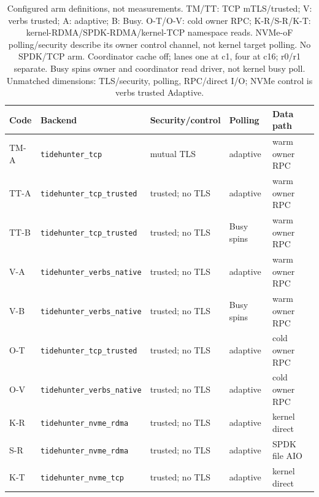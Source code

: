 \begin{table}[H]\centering\small\setlength{\tabcolsep}{3pt}
\begin{tabular}{lllll}\toprule
Code & Backend & Security/control & Polling & Data path\\\midrule
TM-A & \texttt{tidehunter\_tcp} & mutual TLS & adaptive & warm owner RPC\\
TT-A & \texttt{tidehunter\_tcp\_trusted} & trusted; no TLS & adaptive & warm owner RPC\\
TT-B & \texttt{tidehunter\_tcp\_trusted} & trusted; no TLS & Busy spins & warm owner RPC\\
V-A & \texttt{tidehunter\_verbs\_native} & trusted; no TLS & adaptive & warm owner RPC\\
V-B & \texttt{tidehunter\_verbs\_native} & trusted; no TLS & Busy spins & warm owner RPC\\
O-T & \texttt{tidehunter\_tcp\_trusted} & trusted; no TLS & adaptive & cold owner RPC\\
O-V & \texttt{tidehunter\_verbs\_native} & trusted; no TLS & adaptive & cold owner RPC\\
K-R & \texttt{tidehunter\_nvme\_rdma} & trusted; no TLS & adaptive & kernel direct\\
S-R & \texttt{tidehunter\_nvme\_rdma} & trusted; no TLS & adaptive & SPDK file AIO\\
K-T & \texttt{tidehunter\_nvme\_tcp} & trusted; no TLS & adaptive & kernel direct\\
\bottomrule\end{tabular}
\caption{Configured arm definitions, not measurements. TM/TT: TCP mTLS/trusted; V: verbs trusted; A: adaptive; B: Busy. O-T/O-V: cold owner RPC; K-R/S-R/K-T: kernel-RDMA/SPDK-RDMA/kernel-TCP namespace reads. NVMe-oF polling/security describe its owner control channel, not kernel target polling. No SPDK/TCP arm. Coordinator cache off; lanes one at c1, four at c16; r0/r1 separate. Busy spins owner and coordinator read driver, not kernel busy poll. Unmatched dimensions: TLS/security, polling, RPC/direct I/O; NVMe control is verbs trusted Adaptive.}
\end{table}
